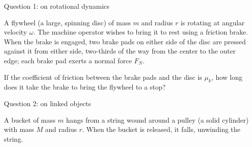 \documentclass[12pt]{article}
\begin{document}
%
%
%
%
%
%
%

\Large
\centerline{}
\normalsize
\centerline{}


\centerline{\large Question 1: on rotational dynamics}
A flywheel (a large, spinning disc) of mass $m$ and radius $r$ is rotating
at angular velocity $\omega$. The machine operator wishes to bring it to rest using a friction brake. When the brake
is engaged, two brake pads on either side of the disc are pressed against it from either side, two-thirds
of the way from the center to the outer edge; each brake pad
exerts a normal force $F_N$.

If the coefficient of friction between the brake pads and the disc is $\mu_k$, how long does it take the
brake to bring the flywheel to a stop?

\newpage
\centerline{\large Question 2: on linked objects}

A bucket of mass $m$ hangs from a string wound around a pulley
(a solid cylinder) with mass $M$ and radius $r$. When the bucket is
released, it falls, unwinding the string.
\end{document}
